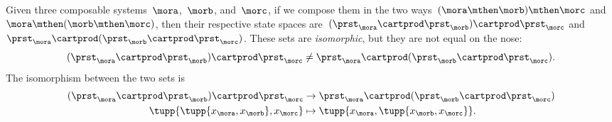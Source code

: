 Given three composable systems~$\mora$,~$\morb$, and~$\morc$, if we compose them in the two ways~$(\mora \mthen \morb) \mthen \morc$ and~$\mora \mthen (\morb \mthen \morc)$, then their respective state spaces are~$(\prst_{\mora} \cartprod \prst_{\morb}) \cartprod \prst_{\morc}$ and~$\prst_{\mora} \cartprod (\prst_{\morb} \cartprod \prst_{\morc})$.
These sets are \emph{isomorphic}, but they are not equal on the nose:
    \begin{equation}
        \label{eq:assoc-fails1}
        (\prst_{\mora} \cartprod \prst_{\morb}) \cartprod \prst_{\morc} \neq \prst_{\mora} \cartprod (\prst_{\morb} \cartprod \prst_{\morc}).
    \end{equation}
The isomorphism between the two sets is
\begin{equation}
\label{eq:assoc-fails2}
\begin{aligned}
(\prst_{\mora} \cartprod \prst_{\morb}) \cartprod \prst_{\morc} &\to \prst_{\mora} \cartprod (\prst_{\morb} \cartprod \prst_{\morc})\\
\tupp{ \tupp{x_{\mora}, x_{\morb}}, x_{\morc} }  &\mapsto \tupp{x_{\mora}, \tupp{x_{\morb}, x_{\morc}} }.
\end{aligned}
\end{equation}
